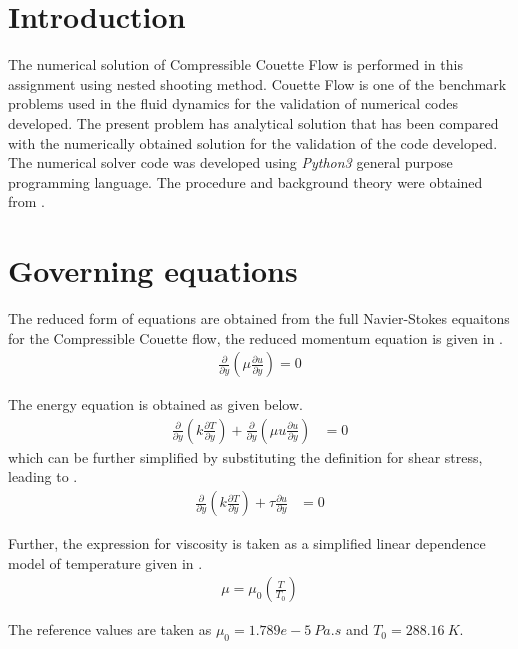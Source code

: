 \section{Introduction}
The numerical solution of Compressible Couette Flow is performed in this assignment
using nested shooting method. Couette Flow is one of the benchmark problems used in
the fluid dynamics for the validation of numerical codes developed. The present
problem has analytical solution that has been compared with the numerically
obtained solution for the validation of the code developed. The numerical
solver code was developed using \emph{Python3} general purpose programming
language. The procedure and background theory were obtained from \cite{ref_1}.

\section{Governing equations}
\par The reduced form of equations are obtained from the full Navier-Stokes equaitons
for the Compressible Couette flow, the reduced momentum equation is given in .
\begin{align}
    \frac{\partial}{\partial y}\left( \mu \frac{\partial u}{\partial y}\right) = 0 \label{u_eqn}
\end{align}

\par The energy equation is obtained as given below.
\begin{align}
    \frac{\partial}{\partial y}\left(k \frac{\partial T}{\partial y}\right) + \frac{\partial}{\partial y}\left(\mu u \frac{\partial u}{\partial y}\right) &= 0 \nonumber
\end{align}
which can be further simplified by substituting the definition for shear stress, leading to .
\begin{align}
    \frac{\partial}{\partial y}\left(k \frac{\partial T}{\partial y}\right) + \tau \frac{\partial u}{\partial y} &= 0 \label{t_eqn}
\end{align}

\par Further, the expression for viscosity is taken as a simplified linear
dependence model of temperature given in .
\begin{align}
    \mu = \mu_0 \left(\frac{T}{T_0}\right) \label{mu_eqn}
\end{align}
\par The reference values are taken as \(\mu_0 = 1.789e-5 \ Pa.s\) and
\(T_0 = 288.16 \ K\).

